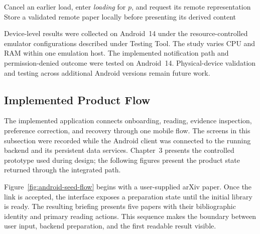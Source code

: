 \begin{algorithm}[htbp]
  \caption{Origin-aware mobile paper resolution}
  \label{alg:mobile-paper-resolution}
  Cancel an earlier load, enter \emph{loading} for \(p\), and request its remote representation\;
  Store a validated remote paper locally before presenting its derived content\;
\end{algorithm}

Device-level results were collected on Android~14 under the resource-controlled emulator configurations described under Testing Tool.
The study varies CPU and RAM within one emulation host.
The implemented notification path and permission-denied outcome were tested on
Android~14. Physical-device validation and testing across additional Android
versions remain future work.

\subsection{Implemented Product Flow}
\label{subsec:implemented-product-flow}

The implemented application connects onboarding, reading, evidence inspection,
preference correction, and recovery through one mobile flow. The screens in
this subsection were recorded while the Android client was connected to the
running backend and its persistent data services. Chapter~3 presents the
controlled prototype used during design; the following figures present the
product state returned through the integrated path.

Figure~\ref{fig:android-seed-flow} begins with a user-supplied arXiv paper. Once
the link is accepted, the interface exposes a preparation state until the
initial library is ready. The resulting briefing presents five papers with
their bibliographic identity and primary reading actions. This sequence makes
the boundary between user input, backend preparation, and the first readable
result visible.

